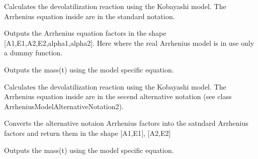 \documentclass[letterpaper,10pt,english]{sphinxmanual}
\begin{document}
\begin{fulllineitems}
\label{FittingClasses:Fit_one_run.Kobayashi}
Calculates the devolatilization reaction using the Kobayashi model. The Arrhenius equation inside are in the standard notation.

\begin{fulllineitems}
\label{FittingClasses:Fit_one_run.Kobayashi.ConvertKinFactors}
Outputs the Arrhenius equation factors in the shape {[}A1,E1,A2,E2,alpha1,alpha2{]}. Here where the real Arrhenius model is in use only a dummy function.

\end{fulllineitems}


\begin{fulllineitems}
\label{FittingClasses:Fit_one_run.Kobayashi.calcMass}
Outputs the mass(t) using the model specific equation.

\end{fulllineitems}


\end{fulllineitems}


\begin{fulllineitems}
\label{FittingClasses:Fit_one_run.KobayashiA2}
Calculates the devolatilization reaction using the Kobayashi model. The Arrhenius equation inside are in the secend alternative notation (see class ArrheniusModelAlternativeNotation2).

\begin{fulllineitems}
\label{FittingClasses:Fit_one_run.KobayashiA2.ConvertKinFactors}
Converts the alternative notaion Arrhenius factors into the satndard Arrhenius factors and return them in the shape  {[}A1,E1{]}, {[}A2,E2{]}

\end{fulllineitems}


\begin{fulllineitems}
\label{FittingClasses:Fit_one_run.KobayashiA2.calcMass}
Outputs the mass(t) using the model specific equation.

\end{fulllineitems}


\end{fulllineitems}
\end{document}
